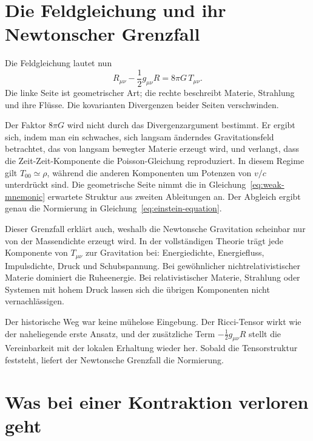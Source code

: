 \section{Die Feldgleichung und ihr Newtonscher Grenzfall}

Die Feldgleichung lautet nun
\begin{equation}
 \boxed{
 R_{\mu\nu}-\frac12 g_{\mu\nu}R
 =
 8\pi G\,T_{\mu\nu}
 }.
 \label{eq:einstein-equation}
\end{equation}
Die linke Seite ist geometrischer Art; die rechte beschreibt Materie, Strahlung und ihre Flüsse. Die kovarianten Divergenzen beider Seiten verschwinden.

Der Faktor \(8\pi G\) wird nicht durch das Divergenzargument bestimmt. Er ergibt sich, indem man ein schwaches, sich langsam änderndes Gravitationsfeld betrachtet, das von langsam bewegter Materie erzeugt wird, und verlangt, dass die Zeit-Zeit-Komponente die Poisson-Gleichung reproduziert. In diesem Regime gilt \(T_{00}\simeq\rho\), während die anderen Komponenten um Potenzen von \(v/c\) unterdrückt sind. Die geometrische Seite nimmt die in Gleichung~\eqref{eq:weak-mnemonic} erwartete Struktur aus zweiten Ableitungen an. Der Abgleich ergibt genau die Normierung in Gleichung~\eqref{eq:einstein-equation}.

Dieser Grenzfall erklärt auch, weshalb die Newtonsche Gravitation scheinbar nur von der Massendichte erzeugt wird. In der vollständigen Theorie trägt jede Komponente von \(T_{\mu\nu}\) zur Gravitation bei: Energiedichte, Energiefluss, Impulsdichte, Druck und Schubspannung. Bei gewöhnlicher nichtrelativistischer Materie dominiert die Ruheenergie. Bei relativistischer Materie, Strahlung oder Systemen mit hohem Druck lassen sich die übrigen Komponenten nicht vernachlässigen.

Der historische Weg war keine mühelose Eingebung. Der Ricci-Tensor wirkt wie der naheliegende erste Ansatz, und der zusätzliche Term \(-\tfrac12g_{\mu\nu}R\) stellt die Vereinbarkeit mit der lokalen Erhaltung wieder her. Sobald die Tensorstruktur feststeht, liefert der Newtonsche Grenzfall die Normierung.

\section{Was bei einer Kontraktion verloren geht}

\begin{classroomqa}
\end{classroomqa}

